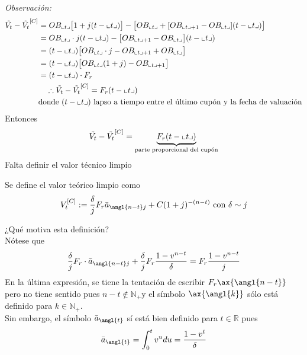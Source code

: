 \textit{Observación:}
\begin{align*}
    \Tilde{V_t} - \Tilde{V_t}^{[C]} &= OB_{\llcorner t\lrcorner}\big[1+j(t-\llcorner t\lrcorner)\big] - \big[OB_{\llcorner t\lrcorner} + [OB_{\llcorner t\lrcorner+1} - OB_{\llcorner t\lrcorner}](t-\llcorner t\lrcorner)\big] \\
    &= OB_{\llcorner t\lrcorner}\cdot j(t-\llcorner t\lrcorner) - \big[OB_{\llcorner t\lrcorner+1} - OB_{\llcorner t\lrcorner}\big](t-\llcorner t\lrcorner)\\
    &= (t-\llcorner t\lrcorner)\big[OB_{\llcorner t\lrcorner}\cdot j - OB_{\llcorner t\lrcorner+1}+ OB_{\llcorner t\lrcorner}\big]\\
    &= (t-\llcorner t\lrcorner)\big[OB_{\llcorner t\lrcorner}(1+j) - OB_{\llcorner t\lrcorner+1}\big]\\
    &=(t-\llcorner t\lrcorner)\cdot F_r\\
    &\quad\therefore\Tilde{V_t} - \Tilde{V_t}^{[C]} = F_r(t-\llcorner t\lrcorner)\\
    &\text{donde }(t-\llcorner t\lrcorner)\text{ lapso a tiempo entre el último cupón y la fecha de valuación}
\end{align*}
Entonces
$$\Tilde{V_t} - \Tilde{V_t}^{[C]} = \underbrace{F_r(t-\llcorner t\lrcorner)}_{\text{parte proporcional del cupón}}$$
Falta definir el valor técnico limpio
\begin{definition}
Se define el valor teórico limpio como
$$V_t^{[C]} := \frac{\delta}{j}F_r\Bar{a}_{\angl{n-t}j} + C(1+j)^{-(n-t)} \text{ con }\delta\sim j$$
\end{definition}

¿Qué motiva esta definición?\\
Nótese que
$$\frac{\delta}{j}F_r\cdot\Bar{a}_{\angl{n-t}j} + \frac{\delta}{j}F_r\frac{1-v^{n-t}}{\delta} = F_r\frac{1-v^{n-t}}{j}$$
En la última expresión, se tiene la tentación de escribir $F_r\ax{\angl{n-t}}$ pero no tiene sentido pues $n-t\notin \mathbb{N}_+$y el símbolo $\ax{\angl{k}}$ sólo está definido para $k\in\mathbb{N}_+$.\\
Sin embargo, el símbolo $\Bar{a}_{\angl{t}}$ sí está bien definido para $t\in\mathbb{R}$ pues
$$\Bar{a}_{\angl{t}} = \int_0^t v^udu = \frac{1-v^t}{\delta}$$

